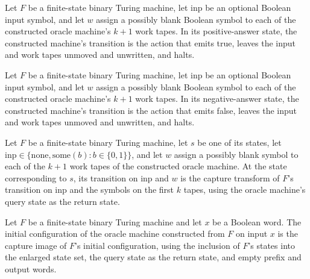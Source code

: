 \begin{theorem}
\label{Complexity.queryTM_yes}
\leanok
{}
Let $F$ be a finite-state binary Turing machine, let $\mathrm{inp}$ be an optional
Boolean input symbol, and let $w$ assign a possibly blank Boolean symbol to each of the
constructed oracle machine's $k+1$ work tapes. In its positive-answer state, the
constructed machine's transition is the action that emits true, leaves the input and
work tapes unmoved and unwritten, and halts.
\end{theorem}

\begin{theorem}
\label{Complexity.queryTM_no}
\leanok
{}
Let $F$ be a finite-state binary Turing machine, let $\mathrm{inp}$ be an optional
Boolean input symbol, and let $w$ assign a possibly blank Boolean symbol to each of the
constructed oracle machine's $k+1$ work tapes. In its negative-answer state, the
constructed machine's transition is the action that emits false, leaves the input and
work tapes unmoved and unwritten, and halts.
\end{theorem}

\begin{theorem}
\label{Complexity.queryTM_agree}
\leanok
{}
Let $F$ be a finite-state binary Turing machine, let $s$ be one of its states, let
$\mathrm{inp}\in\{\mathrm{none},\mathrm{some}(b):b\in\{0,1\}\}$, and let $w$ assign a
possibly blank symbol to each of the $k+1$ work tapes of the constructed oracle machine.
At the state corresponding to $s$, its transition on $\mathrm{inp}$ and $w$ is the
capture transform of $F$'s transition on $\mathrm{inp}$ and the symbols on the first $k$
tapes, using the oracle machine's query state as the return state.
\end{theorem}

\begin{theorem}
\label{Complexity.queryTM_init}
\leanok
{}
Let $F$ be a finite-state binary Turing machine and let $x$ be a Boolean word. The
initial configuration of the oracle machine constructed from $F$ on input $x$ is the
capture image of $F$'s initial configuration, using the inclusion of $F$'s states into
the enlarged state set, the query state as the return state, and empty prefix and output
words.
\end{theorem}

